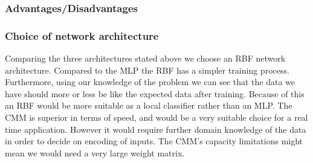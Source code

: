 \documentclass[a4paper, 11pt]{article}
\begin{document}
\subsubsection*{Advantages/Disadvantages}


\subsubsection*{Choice of network architecture}
Comparing the three architectures stated above we choose an RBF network architecture. Compared to the MLP the RBF has a simpler training process. Furthermore, using our knowledge of the problem we can see that the data we have should more or less be like the expected data after training. Because of this an RBF would be more suitable as a local classifier rather than an MLP.
The CMM is superior in terms of speed, and would be a very suitable choice for a real time application. However it would require further domain knowledge of the data in order to decide on encoding of inputs. The CMM's capacity limitations might mean we would need a very large weight matrix. 
\end{document}

